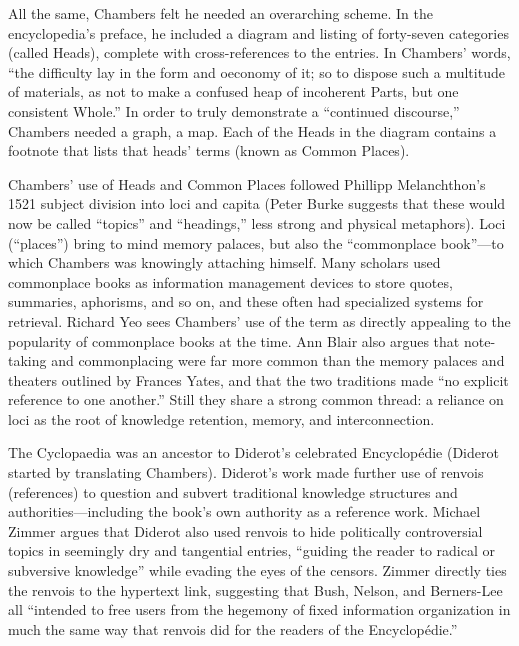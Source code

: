 All the same, Chambers felt he needed an overarching scheme. In the encyclopedia’s preface, he included a diagram and listing of forty-seven categories (called Heads), complete with cross-references to the entries. In Chambers’ words, “the difficulty lay in the form and oeconomy of it; so to dispose such a multitude of materials, as not to make a confused heap of incoherent Parts, but one consistent Whole.”  In order to truly demonstrate a “continued discourse,” Chambers needed a graph, a map. Each of the Heads in the diagram contains a footnote that lists that heads’ terms (known as Common Places). 

Chambers’ use of Heads and Common Places followed Phillipp Melanchthon’s 1521 subject division into loci and capita (Peter Burke suggests that these would now be called “topics” and “headings,” less strong and physical metaphors).  Loci (“places”) bring to mind memory palaces, but also the “commonplace book”—to which Chambers was knowingly attaching himself. Many scholars used commonplace books as information management devices to store quotes, summaries, aphorisms, and so on, and these often had specialized systems for retrieval. Richard Yeo sees Chambers’ use of the term as directly appealing to the popularity of commonplace books at the time.  Ann Blair also argues that note-taking and commonplacing were far more common than the memory palaces and theaters outlined by Frances Yates, and that the two traditions made “no explicit reference to one another.”  Still they share a strong common thread: a reliance on loci as the root of knowledge retention, memory, and interconnection.

The Cyclopaedia was an ancestor to Diderot’s celebrated Encyclopédie (Diderot started by translating Chambers). Diderot’s work made further use of renvois (references) to question and subvert traditional knowledge structures and authorities—including the book’s own authority as a reference work. Michael Zimmer argues that Diderot also used renvois to hide politically controversial topics in seemingly dry and tangential entries, “guiding the reader to radical or subversive knowledge” while evading the eyes of the censors.  Zimmer directly ties the renvois to the hypertext link, suggesting that Bush, Nelson, and Berners-Lee all “intended to free users from the hegemony of fixed information organization in much the same way that renvois did for the readers of the Encyclopédie.” 


